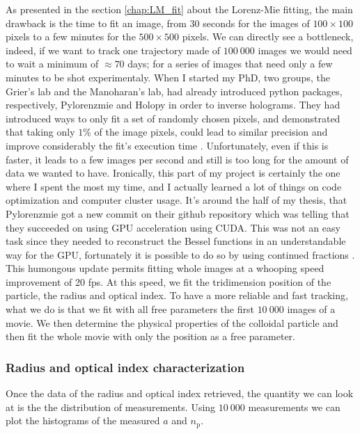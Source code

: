 As presented in the section \ref{chap:LM_fit} about the Lorenz-Mie fitting, the main drawback is the time to fit an image, from $30$ seconds for the images of $100 \times  100$ pixels to a few minutes for the $500\times 500$ pixels. We can directly see a bottleneck, indeed, if we want to track one trajectory made of $100~000$ images we would need to wait a minimum of $\approx 70$ days; for a series of images that need only a few minutes to be shot experimentaly. When I started my PhD, two groups, the Grier's lab and the Manoharan's lab, had already introduced python packages, respectively, Pylorenzmie and Holopy in order to inverse holograms. They had introduced ways to only fit a set of randomly chosen pixels, and demonstrated that taking only $1\%$ of the image pixels, could lead to similar precision and improve considerably the fit's execution time \cite{dimiduk_random-subset_2014}. Unfortunately, even if this is faster, it leads to a few images per second and still is too long for the amount of data we wanted to have. Ironically, this part of my project is certainly the one where I spent the most my time, and I actually learned a lot of things on code optimization and computer cluster usage. It's around the half of my thesis, that Pylorenzmie got a new commit on their github repository which was telling that they succeeded on using GPU acceleration using CUDA. This was not an easy task since they needed to reconstruct the Bessel functions in an understandable way for the GPU, fortunately it is possible to do so by using continued fractions \cite{lentz_generating_1976}. This humongous update permits fitting whole images at a whooping speed improvement of 20 fps. At this speed, we fit the tridimension position of the particle, the radius and optical index. To have a more reliable and fast tracking, what we do is that we fit with all free parameters the first $10~000$ images of a movie. We then determine the physical properties of the colloidal particle and then fit the whole movie with only the position as a free parameter.

\subsubsection{Radius and optical index characterization}


Once the data of the radius and optical index retrieved, the quantity we can look at is the the distribution of measurements. Using $10 ~ 000$ measurements we can plot the histograms of the measured $a$ and $n_\mathrm{p}$.




